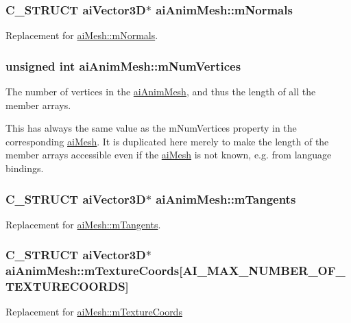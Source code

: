 \subsubsection[{\texorpdfstring{m\+Normals}{mNormals}}]{\setlength{\rightskip}{0pt plus 5cm}C\+\_\+\+S\+T\+R\+U\+CT {\bf ai\+Vector3D}$\ast$ ai\+Anim\+Mesh\+::m\+Normals}\hypertarget{structai_anim_mesh_a64a07a8c5c419b1e006c5302bca4d334}{}\label{structai_anim_mesh_a64a07a8c5c419b1e006c5302bca4d334}
Replacement for \hyperlink{structai_mesh_aec81b496b4d93838cef038933dabe9b9}{ai\+Mesh\+::m\+Normals}. 
\subsubsection[{\texorpdfstring{m\+Num\+Vertices}{mNumVertices}}]{\setlength{\rightskip}{0pt plus 5cm}unsigned int ai\+Anim\+Mesh\+::m\+Num\+Vertices}\hypertarget{structai_anim_mesh_a6bb0d45317a1bbea7f2b7f8191d0c436}{}\label{structai_anim_mesh_a6bb0d45317a1bbea7f2b7f8191d0c436}
The number of vertices in the \hyperlink{structai_anim_mesh}{ai\+Anim\+Mesh}, and thus the length of all the member arrays.

This has always the same value as the m\+Num\+Vertices property in the corresponding \hyperlink{structai_mesh}{ai\+Mesh}. It is duplicated here merely to make the length of the member arrays accessible even if the \hyperlink{structai_mesh}{ai\+Mesh} is not known, e.\+g. from language bindings. 
\subsubsection[{\texorpdfstring{m\+Tangents}{mTangents}}]{\setlength{\rightskip}{0pt plus 5cm}C\+\_\+\+S\+T\+R\+U\+CT {\bf ai\+Vector3D}$\ast$ ai\+Anim\+Mesh\+::m\+Tangents}\hypertarget{structai_anim_mesh_a95dcc49c6d5ecc570ceb54552a0a9625}{}\label{structai_anim_mesh_a95dcc49c6d5ecc570ceb54552a0a9625}
Replacement for \hyperlink{structai_mesh_af367ff78bd69f3e83d7edc8ad67dc5df}{ai\+Mesh\+::m\+Tangents}. 
\subsubsection[{\texorpdfstring{m\+Texture\+Coords}{mTextureCoords}}]{\setlength{\rightskip}{0pt plus 5cm}C\+\_\+\+S\+T\+R\+U\+CT {\bf ai\+Vector3D}$\ast$ ai\+Anim\+Mesh\+::m\+Texture\+Coords\mbox{[}A\+I\+\_\+\+M\+A\+X\+\_\+\+N\+U\+M\+B\+E\+R\+\_\+\+O\+F\+\_\+\+T\+E\+X\+T\+U\+R\+E\+C\+O\+O\+R\+DS\mbox{]}}\hypertarget{structai_anim_mesh_ad24a0451adeb845a53eb2351b9462e0a}{}\label{structai_anim_mesh_ad24a0451adeb845a53eb2351b9462e0a}
Replacement for \hyperlink{structai_mesh_a4a50b11d00ef50f419c75cab0f6bddd6}{ai\+Mesh\+::m\+Texture\+Coords} 
